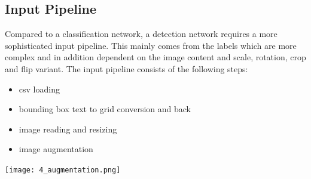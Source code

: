 \documentclass[landscape,a2,final,12pt]{issposter}
\begin{document}
\begin{multicols}{3}
    \begin{samepage}
    \section{Input Pipeline}
        
            \begin{small}Compared to a classification network, a detection network requires a more sophisticated input pipeline. 
            This mainly comes from the labels which are more complex and in addition dependent on the image content and scale,
             rotation, crop and flip variant. The input pipeline consists of the following steps:
            \begin{itemize}
                \item csv loading
                \item bounding box text to grid conversion and back
                \item image reading and resizing
                \item image augmentation
            \end{itemize}
            \begin{minipage}[t]{0.3\textwidth}
                \begin{center}
                    \texttt{[image: 4\_augmentation.png]}
                \end{center}
            \end{minipage}
            \end{small}
    \end{samepage}
    \columnbreak
    \begin{samepage}

\end{samepage}
\end{multicols}
\end{document}
